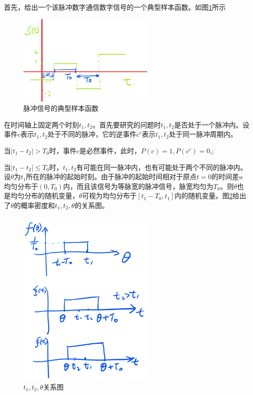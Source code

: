 \documentclass[10pt,a4paper,UTF8]{article}
\begin{document}
\begin{answer}
首先，给出一个该脉冲数字通信数字信号的一个典型样本函数。如图\ref{fig:orga4a4c7f}所示
\begin{figure}[htbp]
\centering
\includegraphics[width=0.6\textwidth]{../../img/math_stochastic/201704191dot2.png}
\caption{\label{fig:orga4a4c7f}
脉冲信号的典型样本函数}
\end{figure}



在时间轴上固定两个时刻\(t_{1},t_{2}\)。首先要研究的问题时\(t_{1},t_{2}\)是否处于一个脉冲内。设事件\(c\)表示\(t_{1},t_{2}\)处于不同的脉冲，它的逆事件\(c^{c}\)表示\(t_{1},t_{2}\)处于同一脉冲周期内。

当\(|t_{1} - t_{2}| > T_{0}\)时，事件\(c\)是必然事件，此时，\(P(c) = 1,P(c^{c}) = 0\),;

当\(|t_{1} - t_{2}| \leq T_{0}\)时，\(t_{1},t_{2}\)有可能在同一脉冲内，也有可能处于两个不同的脉冲内。设\(\theta\)为\(t_{1}\)所在的脉冲的起始时刻。由于脉冲的起始时间相对于原点\(t=0\)的时间差\(u\)均匀分布于\((0,T_{0})\)内，而且该信号为等脉宽的脉冲信号，脉宽均匀为\(T_{0}\)。则\(\theta\)也是均匀分布的随机变量，\(\theta\)可视为均匀分布于\([t_{1}-T_{0},t_{1}]\)内的随机变量。图\ref{fig:orgc9bbe89}给出了\(\theta\)的概率密度和\(t_{1},t_{2},\theta\)的关系图。

\begin{figure}[htbp]
\centering
\includegraphics[width=0.6\textwidth]{../../img/math_stochastic/201704191dot3.png}
\caption{\label{fig:orgc9bbe89}
\(t_{1},t_{2},\theta\)关系图}
\end{figure}


\end{answer}
\end{document}
